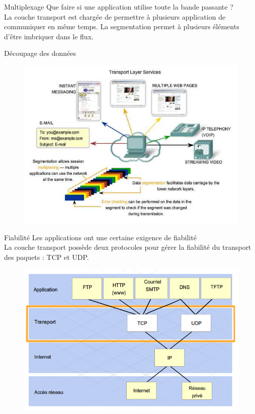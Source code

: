 \documentclass{beamer}
\begin{document}
	\begin{frame}{Multiplexage}
		Que faire si une application utilise toute la bande passante ? \\
		La couche transport est chargée de permettre à plusieurs application de communiquer en même temps. La segmentation permet à plusieurs éléments d'être imbriquer dans le flux.
	\end{frame}

	\begin{frame}{Découpage des données}
		\begin{figure}
			\includegraphics[scale=0.4]{TRANSPORT.jpg}
		\end{figure}
	\end{frame}

	\begin{frame}{Fiabilité}
		Les applications ont une certaine exigence de fiabilité\\
		La couche transport possède deux protocoles pour gérer la fiabilité du transport des paquets : TCP et UDP.
		\begin{figure}
			\includegraphics[scale=0.5]{UDP.png}
		\end{figure}
	\end{frame}
\end{document}
